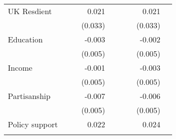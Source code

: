 \documentclass{article}
\begin{document}
\begin{table}[!h]
\begin{tabular}{lllllllll}
\multicolumn{1}{l}{UK Resdient} &
  \multicolumn{1}{r}{} &
  \multicolumn{1}{l}{} &
  \multicolumn{1}{r}{0.021} &
  \multicolumn{1}{l}{} &
  \multicolumn{1}{r}{} &
  \multicolumn{1}{l}{} &
  \multicolumn{1}{r}{0.021} &
  \multicolumn{1}{l}{} \\
\multicolumn{1}{l}{} &
  \multicolumn{1}{r}{} &
  \multicolumn{1}{l}{} &
  \multicolumn{1}{r}{(0.033)} &
  \multicolumn{1}{l}{} &
  \multicolumn{1}{r}{} &
  \multicolumn{1}{l}{} &
  \multicolumn{1}{r}{(0.033)} &
  \multicolumn{1}{l}{} \\
\multicolumn{1}{l}{Education} &
  \multicolumn{1}{r}{} &
  \multicolumn{1}{l}{} &
  \multicolumn{1}{r}{-0.003} &
  \multicolumn{1}{l}{} &
  \multicolumn{1}{r}{} &
  \multicolumn{1}{l}{} &
  \multicolumn{1}{r}{-0.002} &
  \multicolumn{1}{l}{} \\
\multicolumn{1}{l}{} &
  \multicolumn{1}{r}{} &
  \multicolumn{1}{l}{} &
  \multicolumn{1}{r}{(0.005)} &
  \multicolumn{1}{l}{} &
  \multicolumn{1}{r}{} &
  \multicolumn{1}{l}{} &
  \multicolumn{1}{r}{(0.005)} &
  \multicolumn{1}{l}{} \\
\multicolumn{1}{l}{Income} &
  \multicolumn{1}{r}{} &
  \multicolumn{1}{l}{} &
  \multicolumn{1}{r}{-0.001} &
  \multicolumn{1}{l}{} &
  \multicolumn{1}{r}{} &
  \multicolumn{1}{l}{} &
  \multicolumn{1}{r}{-0.003} &
  \multicolumn{1}{l}{} \\
\multicolumn{1}{l}{} &
  \multicolumn{1}{r}{} &
  \multicolumn{1}{l}{} &
  \multicolumn{1}{r}{(0.005)} &
  \multicolumn{1}{l}{} &
  \multicolumn{1}{r}{} &
  \multicolumn{1}{l}{} &
  \multicolumn{1}{r}{(0.005)} &
  \multicolumn{1}{l}{} \\
\multicolumn{1}{l}{Partisanship} &
  \multicolumn{1}{r}{} &
  \multicolumn{1}{l}{} &
  \multicolumn{1}{r}{-0.007} &
  \multicolumn{1}{l}{} &
  \multicolumn{1}{r}{} &
  \multicolumn{1}{l}{} &
  \multicolumn{1}{r}{-0.006} &
  \multicolumn{1}{l}{} \\
\multicolumn{1}{l}{} &
  \multicolumn{1}{r}{} &
  \multicolumn{1}{l}{} &
  \multicolumn{1}{r}{(0.005)} &
  \multicolumn{1}{l}{} &
  \multicolumn{1}{r}{} &
  \multicolumn{1}{l}{} &
  \multicolumn{1}{r}{(0.005)} &
  \multicolumn{1}{l}{} \\
\multicolumn{1}{l}{Policy support} &
  \multicolumn{1}{r}{} &
  \multicolumn{1}{l}{} &
  \multicolumn{1}{r}{0.022} &
  \multicolumn{1}{l}{} &
  \multicolumn{1}{r}{} &
  \multicolumn{1}{l}{} &
  \multicolumn{1}{r}{0.024} &
  \multicolumn{1}{l}{} \\
\multicolumn{1}{l}{} &
  \multicolumn{1}{r}{} &
  \multicolumn{1}{l}{} &

\end{tabular}
\end{table}
\end{document}
